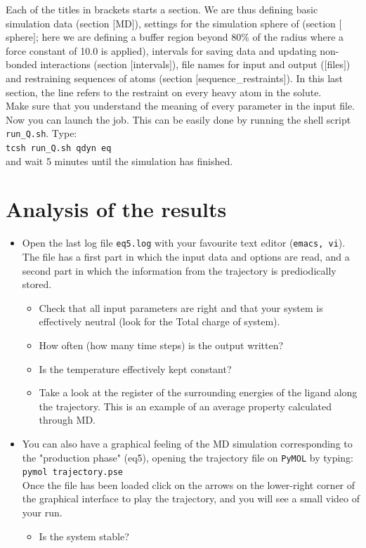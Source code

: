 \documentclass[a4paper,12pt]{article}
\newcommand{\runsh}{\texttt{run{\_}Q.sh}}
\newcommand{\pymol}{\texttt{PyMOL}}
\begin{document}
Each of the titles in brackets starts a section. We are thus defining basic simulation data (section $[$MD$]$), settings for the 
simulation sphere of (section $[$sphere$]$; here we are defining a buffer region beyond 80\% of the radius where a force constant of 10.0 is applied), intervals for saving data and updating non-bonded interactions (section $[$intervals$]$), file names for input and output ($[$files$]$) and restraining sequences of atoms (section $[$sequence\_restraints$]$). In this last section, the line refers to the restraint on every heavy atom in the solute.\\
Make sure that you understand the meaning of every parameter in the input file.
Now you can launch the job. This can be easily done by running the shell script {\runsh}. Type:\\
{\texttt {tcsh run\_Q.sh qdyn eq}}\\
and wait 5 minutes until the simulation has finished.\\

\section {Analysis of the results}
\begin{itemize}
\item Open the last log file {\texttt {eq5.log}} with your favourite text editor (\texttt{emacs, vi}). The file has a first part in which the input data and options are read, and a second part in which the information from the trajectory is prediodically stored.
    \begin{itemize}
    \item Check that all input parameters are right and that your system is effectively neutral (look for the Total charge of system).
    \item How often (how many time steps) is the output written?
    \item Is the temperature effectively kept constant?
    \item Take a look at the register of the surrounding energies of the ligand along the trajectory. This is an example of an average property calculated through MD.
    \end {itemize}
\item You can also have a graphical feeling of the MD simulation corresponding to the "production phase" (eq5), opening the trajectory file on {\pymol} by typing:\\
\texttt{pymol trajectory.pse} \\
Once the file has been loaded click on the arrows on the
lower-right corner of the graphical interface to play the
trajectory, and you will see a small video of your run.
\begin {itemize}
\item Is the system stable?
\end {itemize}
\end {itemize}
\end{document}
